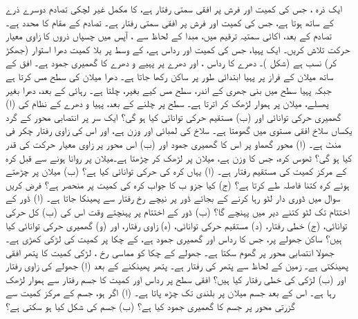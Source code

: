 ایک ذرہ ، جس کی کمیت  اور  فرش پر افقی سمتی رفتار  ہے، کا مکمل غیر لچکی تصادم دوسرے ذرے کے ساتھ ہوتا ہے، جس کی کمیت  اور فرش پر افقی سمتی رفتار  ہے۔  تصادم کے مقام کا محدد  ہے۔ تصادم کے بعد، اکائی سمتیہ ترقیم میں، مبدا کے لحاظ سے  ، آپس میں چسپاں ذروں  کا زاوی معیار حرکت تلاش کریں۔
ایک پہیا، جس کی کمیت  اور رداس  ہے،  کے وسط پر بلا کمیت دھرا استوار (جھکڑ کر)  نسب ہے (شکل )۔ دھرے کا رداس ،  اور   دھرے پر  پہیے و دھرے کا گھمیری جمود  ہے۔ افق کے ساتھ  میلان  کے فراز پر پہیا ابتدائی طور پر ساکن رکھا جاتا ہے۔ دھرا  میلان  کی سطح مس کرتا ہے  جبکہ  پہیا  سطح میں بنی جھری  کے اندر، سطح مس کیے بغیر،   چلتا ہے۔ رہائی کے بعد، دھرا بغیر پھسلے، میلان پر ہموار لڑھک کر اترتا  ہے۔ سطح پر  چلنے کے بعد، پہیا و دھرے کے نظام کی   (ا) گھمیری حرکی توانائی اور (ب)  مستقیم حرکی توانائی کیا ہو گی؟
ایک سر پر انتصابی محور کے گرد یکساں سلاخ افقی مستوی میں گھومتا ہے۔ سلاخ کی لمبائی  اور وزن  ہے، اور اس کی زاوی رفتار  چکر فی منٹ ہے۔ (ا)  محور گھماو پر اس کا گھمیری جمود اور (ب)   اس محور پر زاوی معیار حرکت کی قدر کیا ہو گی؟
ٹھوس کرہ، جس کا وزن   ہے،  میلان  پر لڑھک کر  چڑھتا ہے۔میلان  پر روانا ہونے سے قبل کرہ کے مرکز کمیت کی مستقیم رفتار  ہے۔ (ا)  یہاں کرہ کی حرکی توانائی کیا ہے؟  (ب)  میلان پر  چڑھتے ہوئے کرہ کتنا فاصلہ طے کرتا ہے؟ (ج) کیا جزو ب کا جواب کرہ کی کمیت پر منحصر ہے؟
فرض کریں  سوال  میں ڈوری دار لٹو  رہا کرنے کے بجائے ڈور پر نیچے رخ  رفتار سے پھینکا جاتا ہے۔ (ا)  ڈور کے اختتام تک لٹو کتنے دیر میں پہنچے گا؟ (ب)  ڈور کے اختتام پر پہنچتے وقت اس کی (ب) کل حرکی توانائی، (ج) خطی رفتار، (د) مستقیم حرکی توانائی، (ہ) زاوی رفتار، اور (و) گھمیری حرکی توانائی کیا ہیں؟
ساکن جھولے پر، جس کا رداس  اور گھمیری جمود  ہے،  کے چکا پر کمیت  کی لڑکی کھڑی ہے۔ جھولا انتصابی محور پر گھوم سکتا ہے۔ جھولے کے چکا کو مماسی رخ ، لڑکی کمیت  کا پتھر افقی پھینکتی ہے۔ زمین کے لحاظ سے پتھر کی رفتار  ہے۔ پتھر پھینکنے کے بعد (ا) جھولے کی زاوی رفتار اور (ب) لڑکی کی خطی رفتار کیا ہیں؟
افقی سطح پر رداس  اور کمیت  کا جسم   رفتار سے ہموار لڑھک رہا ہے۔ اس کے بعد جسم  میلان پر   بلندی تک چڑھ پاتا ہے۔ (ا) اگر  ہو، جسم کے مرکز کمیت سے گزرتی محور پر جسم کا گھمیری جمود کیا ہے؟ (ب) جسم کی شکل کیا ہو سکتی ہے؟
